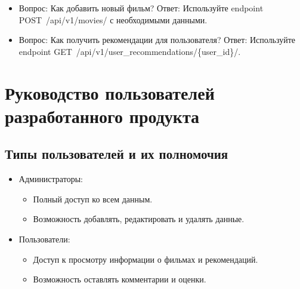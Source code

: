 \begin{itemize}
\tightlist
\item
  Вопрос: Как добавить новый фильм? Ответ: Используйте
  endpoint POST\ /api/v1/movies/ с необходимыми данными.
\item
  Вопрос: Как получить рекомендации для пользователя?
  Ответ: Используйте endpoint
  GET\ /api/v1/user\_recommendations/\{user\_id\}/.
\end{itemize}

\hypertarget{ux440ux443ux43aux43eux432ux43eux434ux441ux442ux432ux43e-ux43fux43eux43bux44cux437ux43eux432ux430ux442ux435ux43bux435ux439-ux440ux430ux437ux440ux430ux431ux43eux442ux430ux43dux43dux43eux433ux43e-ux43fux440ux43eux434ux443ux43aux442ux430}{%
\section{Руководство пользователей разработанного
продукта}\label{ux440ux443ux43aux43eux432ux43eux434ux441ux442ux432ux43e-ux43fux43eux43bux44cux437ux43eux432ux430ux442ux435ux43bux435ux439-ux440ux430ux437ux440ux430ux431ux43eux442ux430ux43dux43dux43eux433ux43e-ux43fux440ux43eux434ux443ux43aux442ux430}}

\hypertarget{ux442ux438ux43fux44b-ux43fux43eux43bux44cux437ux43eux432ux430ux442ux435ux43bux435ux439-ux438-ux438ux445-ux43fux43eux43bux43dux43eux43cux43eux447ux438ux44f}{%
\subsection*{Типы пользователей и их
полномочия}\label{ux442ux438ux43fux44b-ux43fux43eux43bux44cux437ux43eux432ux430ux442ux435ux43bux435ux439-ux438-ux438ux445-ux43fux43eux43bux43dux43eux43cux43eux447ux438ux44f}}

\begin{itemize}
\tightlist
\item
  Администраторы:

  \begin{itemize}
  \tightlist
  \item
    Полный доступ ко всем данным.
  \item
    Возможность добавлять, редактировать и удалять данные.
  \end{itemize}
\item
  Пользователи:

  \begin{itemize}
  \tightlist
  \item
    Доступ к просмотру информации о фильмах и рекомендаций.
  \item
    Возможность оставлять комментарии и оценки.
  \end{itemize}
\end{itemize}

